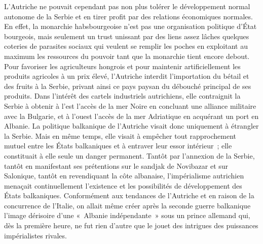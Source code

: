 \documentclass[french,twoside]{book} %
\begin{document}
L'Autriche ne pouvait cependant pas non plus tolérer le développement normal autonome de la Serbie et en tirer profit par des relations économiques normales. En effet, la monarchie habsbourgeoise n’est pas une organisation politique d’État bourgeois, mais seulement un trust unissant par des liens assez lâches quelques coteries de parasites sociaux qui veulent se remplir les poches en exploitant au maximum les ressources du pouvoir tant que la monarchie tient encore debout. Pour favoriser les agriculteurs hongrois et pour maintenir artificiellement les produits agricoles à un prix élevé, l’Autriche interdit l’importation du bétail et des fruits à la Serbie, privant ainsi ce pays paysan du débouché principal de ses produits. Dans l’intérêt des cartels industriels autrichiens, elle contraignit la Serbie à obtenir à l’est l’accès de la mer Noire en concluant une alliance militaire avec la Bulgarie, et à l’ouest l’accès de la mer Adriatique en acquérant un port en Albanie. La politique balkanique de l’Autriche visait donc uniquement à étrangler la Serbie. Mais  en même temps, elle visait à empêcher tout rapprochement mutuel entre les États balkaniques et à entraver leur essor intérieur ; elle constituait à elle seule un danger permanent. Tantôt par l’annexion de la Serbie, tantôt en manifestant ses prétentions sur le sandjak de Novibazar et sur Salonique, tantôt en revendiquant la côte albanaise, l’impérialisme autrichien menaçait continuellement l’existence et les possibilités de développement des États balkaniques. Conformément aux tendances de l’Autriche et en raison de la concurrence de l’Italie, on allait même créer après la seconde guerre balkanique l’image dérisoire d’une « Albanie indépendante » sous un prince allemand qui, dès la première heure, ne fut rien d’autre que le jouet des intrigues des puissances impérialistes rivales.\par
\end{document}
